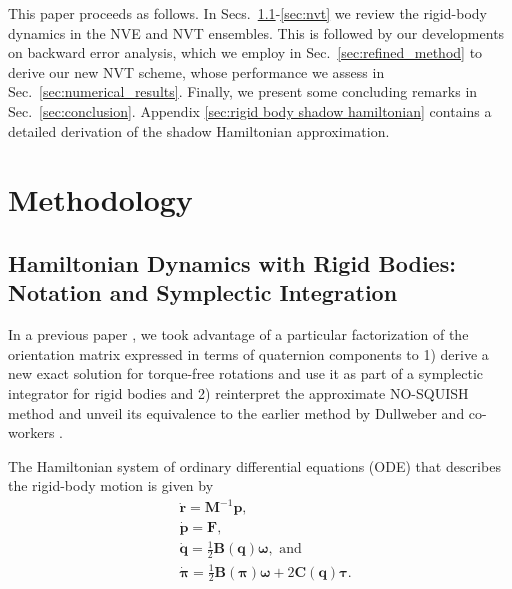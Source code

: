 \documentclass[
journal=jctcce,
layout=twocolumn
]{achemso}
\newcommand{\mt}[1]{\boldsymbol{\mathbf{#1}}}   %
\newcommand{\vt}[1]{\boldsymbol{\mathbf{#1}}}   %
\newcommand{\diff}[2]{\frac{\partial #1}{\partial #2}} %
\newcommand{\Ham}[1]{{\mathcal H}_\text{#1}}    %
\begin{document}
This paper proceeds as follows.
In Secs.~\ref{sec:nve}-\ref{sec:nvt} we review the rigid-body dynamics in the NVE and NVT ensembles.
This is followed by our developments on backward error analysis, which we employ in Sec.~\ref{sec:refined_method} to derive our new NVT scheme, whose performance we assess in Sec.~\ref{sec:numerical_results}.
Finally, we present some concluding remarks in Sec.~\ref{sec:conclusion}. Appendix \ref{sec:rigid body shadow hamiltonian} contains a detailed derivation of the shadow Hamiltonian approximation.

\section{Methodology}
\label{sec:methodology}

\subsection{Hamiltonian Dynamics with Rigid Bodies: Notation and Symplectic Integration}
\label{sec:nve}

In a previous paper \cite{Silveira_2017}, we took advantage of a particular factorization of the orientation matrix expressed in terms of quaternion components to
1) derive a new exact solution for torque-free rotations and use it as part of a symplectic integrator for rigid bodies and
2) reinterpret the approximate NO-SQUISH method \cite{Miller_2002} and unveil its equivalence to the earlier method by Dullweber and co-workers \cite{Dullweber_1997}.

The Hamiltonian system of ordinary differential equations (ODE) that describes the rigid-body motion is given by \cite{Silveira_2017}
\begin{subequations}
	\label{eq:ODE system for NVE}
	\begin{align}
%
	&\dot{\vt r} =
	{\mt M}^{-1} {\vt p}, \\
%
	&\dot{\vt p} =
	{\vt F}, \\
%
	&\dot{\vt q} =
	\frac{1}{2} \mt B(\vt q) \vt \omega, \text{ and} \label{eq:EDO_q} \\
%
	&\dot{\vt \pi} =
	\frac{1}{2} \mt B(\vt \pi) \vt \omega + 2 \mt C(\vt q) \vt \tau. \label{eq:EDO_pi}
	\end{align}
\end{subequations}
\end{document}
